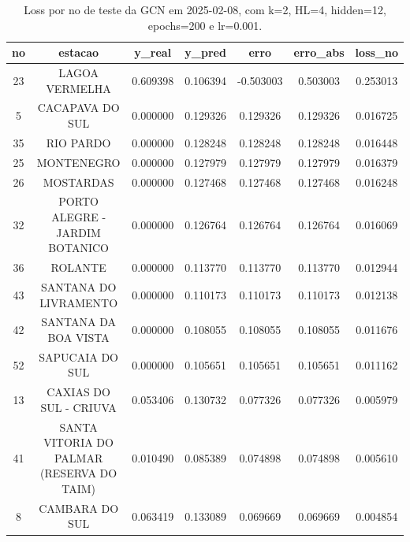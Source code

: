 \begin{table}[h]
\centering
\caption{Loss por no de teste da GCN em 2025-02-08, com k=2, HL=4, hidden=12, epochs=200 e lr=0.001.}
\label{tab:gcn_loss_k2_hl4_h12_e200_d20250208}
\begin{tabular}{ccccccc}
\toprule
no & estacao & y\_real & y\_pred & erro & erro\_abs & loss\_no \\
\midrule
23 & LAGOA VERMELHA & 0.609398 & 0.106394 & -0.503003 & 0.503003 & 0.253013 \\
5 & CACAPAVA DO SUL & 0.000000 & 0.129326 & 0.129326 & 0.129326 & 0.016725 \\
35 & RIO PARDO & 0.000000 & 0.128248 & 0.128248 & 0.128248 & 0.016448 \\
25 & MONTENEGRO & 0.000000 & 0.127979 & 0.127979 & 0.127979 & 0.016379 \\
26 & MOSTARDAS & 0.000000 & 0.127468 & 0.127468 & 0.127468 & 0.016248 \\
32 & PORTO ALEGRE - JARDIM BOTANICO & 0.000000 & 0.126764 & 0.126764 & 0.126764 & 0.016069 \\
36 & ROLANTE & 0.000000 & 0.113770 & 0.113770 & 0.113770 & 0.012944 \\
43 & SANTANA DO LIVRAMENTO & 0.000000 & 0.110173 & 0.110173 & 0.110173 & 0.012138 \\
42 & SANTANA DA BOA VISTA & 0.000000 & 0.108055 & 0.108055 & 0.108055 & 0.011676 \\
52 & SAPUCAIA DO SUL & 0.000000 & 0.105651 & 0.105651 & 0.105651 & 0.011162 \\
13 & CAXIAS DO SUL - CRIUVA & 0.053406 & 0.130732 & 0.077326 & 0.077326 & 0.005979 \\
41 & SANTA VITORIA DO PALMAR (RESERVA DO TAIM) & 0.010490 & 0.085389 & 0.074898 & 0.074898 & 0.005610 \\
8 & CAMBARA DO SUL & 0.063419 & 0.133089 & 0.069669 & 0.069669 & 0.004854 \\
\bottomrule
\end{tabular}
\end{table}
